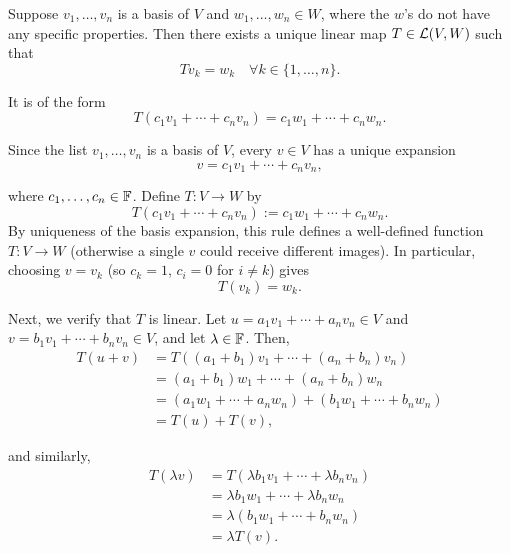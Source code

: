 \setcounter{thm}{3}
\begin{thm}
  \label{thm: linear map lemma}
  Suppose $v_1, \dots, v_n$ is a basis of $V$ and $w_1, \dots, w_n \in W$, where the $w$'s do not have any specific properties. Then there exists a unique linear map $T \in \mathcal{L}(V,W)$ such that
  \begin{equation}
    Tv_{k} = w_k \quad \forall k \in \{1, \dots, n\}.
  \end{equation}

  It is of the form
  \begin{equation}
    T(c_1 v_1 + \cdots + c_n v_n) = c_1 w_1 + \cdots + c_n w_n.
  \end{equation}
\end{thm}
\begin{prf}
  Since the list $v_1, \dots, v_n$ is a basis of $V$, every $v \in V$ has a unique expansion
  \begin{equation}
    v = c_1 v_1 + \cdots + c_n v_n,
  \end{equation}

  where \( c_1, \dots, c_n \in \mathbb{F} \). Define $T: V \to W$ by
  \[
    T(c_1 v_1 + \cdots + c_n v_n) := c_1 w_1 + \cdots + c_n w_n.
  \]
  By uniqueness of the basis expansion, this rule defines a well-defined function \(T\colon V\to W\) (otherwise a single \(v\) could receive different images).
  In particular, choosing \(v=v_k\) (so \(c_k=1\), \(c_i=0\) for \(i\neq k\)) gives
  \[
    T(v_k)=w_k.
  \]

  Next, we verify that \( T \) is linear. Let \( u = a_1 v_1 + \cdots + a_n v_n \in V \) and \( v = b_1 v_1 + \cdots + b_n v_n \in V \), and let \( \lambda \in \mathbb{F} \). Then,
  \begin{align}
    T(u + v) &= T((a_1 + b_1)v_1 + \cdots + (a_n + b_n)v_n) \\
             &= (a_1 + b_1)w_1 + \cdots + (a_n + b_n)w_n \\
             &= (a_1 w_1 + \cdots + a_n w_n) + (b_1 w_1 + \cdots + b_n w_n)  \\
             &= T(u) + T(v),
  \end{align}

  and similarly,
  \begin{align}
    T(\lambda v) &= T(\lambda b_1 v_1 + \cdots + \lambda b_n v_n)  \\
                 &= \lambda b_1 w_1 + \cdots + \lambda b_n w_n  \\
                 &= \lambda (b_1 w_1 + \cdots + b_n w_n) \\
                 &= \lambda T(v).
  \end{align}


\end{prf}

